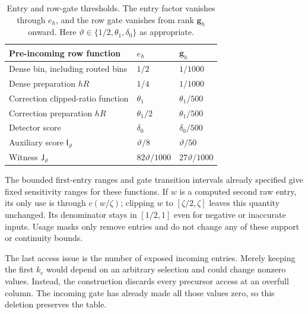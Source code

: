 \documentclass[11pt]{article}
\numberwithin{equation}{section}
\theoremstyle{definition}
\theoremstyle{remark}
\begin{document}
\begin{table}[htbp]
\centering
\begin{tabular}{@{}lll@{}}
\toprule
Pre-incoming row function & $e_{h}$ & ${\mathbf{g}}_{h}$ \\
\midrule
Dense bin, including routed bins & $1/2$ & $1/1000$ \\
Dense preparation $hR$ & $1/4$ & $1/1000$ \\
Correction clipped-ratio function & $\theta_1$ & $\theta_1/500$ \\
Correction preparation $hR$ & $\theta_1/2$ & $\theta_1/500$ \\
Detector score & $\delta_0$ & $\delta_0/500$ \\
Auxiliary score ${\mathsf{I}}_{\vartheta}$ & $\vartheta/8$ & $\vartheta/50$ \\
Witness ${\mathsf{J}}_{\vartheta}$ & $82\vartheta/1000$ & $27\vartheta/1000$ \\
\bottomrule
\end{tabular}
\caption{Entry and row-gate thresholds. The entry factor vanishes through
$e_{h}$, and the row gate vanishes from rank ${\mathbf{g}}_{h}$ onward. Here
$\vartheta\in\{1/2,\theta_1,\delta_0\}$ as appropriate.}
\label{tab:atom-compression-thresholds}
\end{table}

The bounded first-entry ranges and gate transition intervals already
specified give fixed sensitivity ranges for these functions.  If $w$
is a computed second raw entry, its only use is through $c(w/\zeta)$;
clipping $w$ to $[\zeta/2,\zeta]$ leaves this quantity unchanged.
Its denominator stays in $[1/2,1]$ even for negative or inaccurate
inputs.  Usage masks only remove entries and do not change any of these
support or continuity bounds.

The last access issue is the number of exposed incoming entries. Merely keeping the first ${k}_c$ would depend on an arbitrary selection and could change nonzero values. Instead, the construction discards every precursor access at an overfull column. The incoming gate has already made all those values zero, so this deletion preserves the table.
\end{document}
